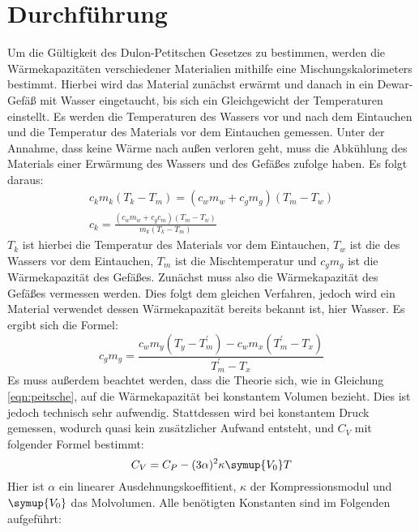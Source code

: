 \section{Durchführung}
\label{sec:Durchführung}
Um die Gültigkeit des Dulon-Petitschen Gesetzes zu bestimmen, werden die Wärmekapazitäten verschiedener Materialien
mithilfe eine Mischungskalorimeters bestimmt.
Hierbei wird das Material zunächst erwärmt und danach in ein Dewar-Gefäß mit Wasser eingetaucht,
bis sich ein Gleichgewicht der Temperaturen einstellt.
Es werden die Temperaturen des Wassers vor und nach dem Eintauchen und die Temperatur des Materials vor dem Eintauchen gemessen.
Unter der Annahme, dass keine Wärme nach außen verloren geht,
muss die Abkühlung des Materials einer Erwärmung des Wassers und des Gefäßes zufolge haben.
Es folgt daraus:
\begin{gather}
    c_km_k(T_k-T_m) = (c_wm_w + c_gm_g)(T_m - T_w) \\
    c_k = \frac{(c_wm_w + c_gc_m)(T_m - T_w)}{m_k(T_k - T_m)}
\end{gather}
$T_k$ ist hierbei die Temperatur des Materials vor dem Eintauchen, $T_w$ ist die des Wassers vor dem Eintauchen,
$T_m$ ist die Mischtemperatur und $c_gm_g$ ist die Wärmekapazität des Gefäßes.
Zunächst muss also die Wärmekapazität des Gefäßes vermessen werden. Dies folgt dem gleichen Verfahren, jedoch wird ein Material verwendet
dessen Wärmekapazität bereits bekannt ist, hier Wasser.
Es ergibt sich die Formel:
\begin{equation}
    \label{eqn:gefaess}
    c_gm_g = \frac{c_wm_y\left(T_y - T^{\prime}_m\right) - c_wm_x\left(T^{\prime}_m - T_x\right)}{T^{\prime}_m - T_x}
\end{equation}
Es muss außerdem beachtet werden, dass die Theorie sich, wie in Gleichung \eqref{eqn:peitsche},
auf die Wärmekapazität bei konstantem Volumen bezieht.
Dies ist jedoch technisch sehr aufwendig. Stattdessen wird bei konstantem Druck gemessen,
wodurch quasi kein zusätzlicher Aufwand entsteht, und $C_V$ mit folgender Formel bestimmt:
\begin{equation}
  \label{eqn:dubbi}
    C_V = C_P - (3\alpha)^2\kappa\symup{V_0}T
\end{equation}
Hier ist $\alpha$ ein linearer Ausdehnungskoeffitient, $\kappa$ der Kompressionsmodul und $\symup{V_0}$ das Molvolumen.
Alle benötigten Konstanten sind im Folgenden aufgeführt:
